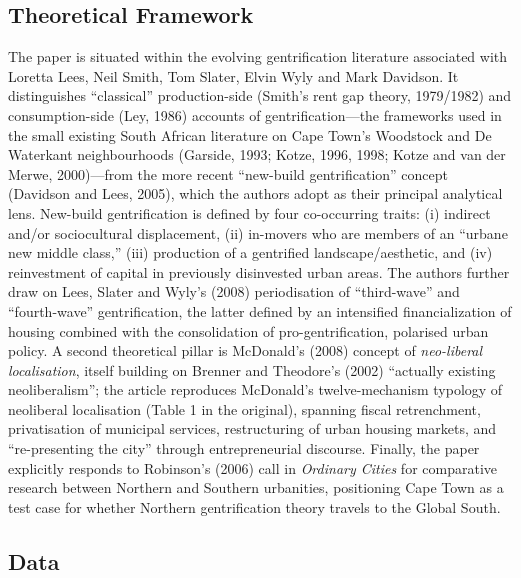 \subsection*{Theoretical Framework}

The paper is situated within the evolving gentrification literature associated with Loretta Lees, Neil Smith, Tom Slater, Elvin Wyly and Mark Davidson. It distinguishes ``classical'' production-side (Smith's rent gap theory, 1979/1982) and consumption-side (Ley, 1986) accounts of gentrification---the frameworks used in the small existing South African literature on Cape Town's Woodstock and De Waterkant neighbourhoods (Garside, 1993; Kotze, 1996, 1998; Kotze and van der Merwe, 2000)---from the more recent ``new-build gentrification'' concept (Davidson and Lees, 2005), which the authors adopt as their principal analytical lens. New-build gentrification is defined by four co-occurring traits: (i) indirect and/or sociocultural displacement, (ii) in-movers who are members of an ``urbane new middle class,'' (iii) production of a gentrified landscape/aesthetic, and (iv) reinvestment of capital in previously disinvested urban areas. The authors further draw on Lees, Slater and Wyly's (2008) periodisation of ``third-wave'' and ``fourth-wave'' gentrification, the latter defined by an intensified financialization of housing combined with the consolidation of pro-gentrification, polarised urban policy. A second theoretical pillar is McDonald's (2008) concept of \emph{neo-liberal localisation}, itself building on Brenner and Theodore's (2002) ``actually existing neoliberalism''; the article reproduces McDonald's twelve-mechanism typology of neoliberal localisation (Table 1 in the original), spanning fiscal retrenchment, privatisation of municipal services, restructuring of urban housing markets, and ``re-presenting the city'' through entrepreneurial discourse. Finally, the paper explicitly responds to Robinson's (2006) call in \emph{Ordinary Cities} for comparative research between Northern and Southern urbanities, positioning Cape Town as a test case for whether Northern gentrification theory travels to the Global South.

\subsection*{Data}

